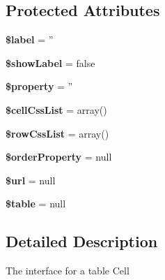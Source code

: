 \subsection*{Protected Attributes}
\begin{DoxyCompactItemize}
\item 
\hypertarget{classTk_1_1Table_1_1Cell_1_1Iface_a53f677024346cac9651bd24a941cd9c9}{{\bfseries \$label} = ''}\label{classTk_1_1Table_1_1Cell_1_1Iface_a53f677024346cac9651bd24a941cd9c9}

\item 
\hypertarget{classTk_1_1Table_1_1Cell_1_1Iface_aa09321e88bc86b84bb1f7a3a7e9eb6fe}{{\bfseries \$show\+Label} = false}\label{classTk_1_1Table_1_1Cell_1_1Iface_aa09321e88bc86b84bb1f7a3a7e9eb6fe}

\item 
\hypertarget{classTk_1_1Table_1_1Cell_1_1Iface_aedcba96f678bd5a227d40446bdfedc89}{{\bfseries \$property} = ''}\label{classTk_1_1Table_1_1Cell_1_1Iface_aedcba96f678bd5a227d40446bdfedc89}

\item 
\hypertarget{classTk_1_1Table_1_1Cell_1_1Iface_a39c204fc1730b960a536946635fc6f90}{{\bfseries \$cell\+Css\+List} = array()}\label{classTk_1_1Table_1_1Cell_1_1Iface_a39c204fc1730b960a536946635fc6f90}

\item 
\hypertarget{classTk_1_1Table_1_1Cell_1_1Iface_abfec6b5ec6e5eccdc4c58c99015e94fb}{{\bfseries \$row\+Css\+List} = array()}\label{classTk_1_1Table_1_1Cell_1_1Iface_abfec6b5ec6e5eccdc4c58c99015e94fb}

\item 
\hypertarget{classTk_1_1Table_1_1Cell_1_1Iface_a9d428588f1868b9b63e6a73ddb483ae7}{{\bfseries \$order\+Property} = null}\label{classTk_1_1Table_1_1Cell_1_1Iface_a9d428588f1868b9b63e6a73ddb483ae7}

\item 
\hypertarget{classTk_1_1Table_1_1Cell_1_1Iface_a671fa6efd79848b32a4df8e3d65f130b}{{\bfseries \$url} = null}\label{classTk_1_1Table_1_1Cell_1_1Iface_a671fa6efd79848b32a4df8e3d65f130b}

\item 
\hypertarget{classTk_1_1Table_1_1Cell_1_1Iface_a33d0747a090837e9d6cd65ade390cf65}{{\bfseries \$table} = null}\label{classTk_1_1Table_1_1Cell_1_1Iface_a33d0747a090837e9d6cd65ade390cf65}

\end{DoxyCompactItemize}


\subsection{Detailed Description}
The interface for a table Cell

